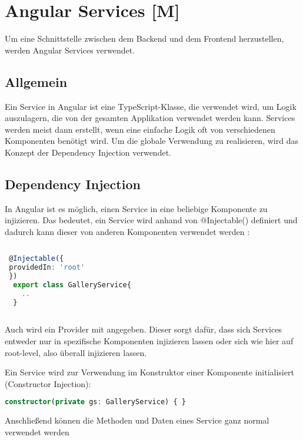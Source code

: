 \section{Angular Services [M]}
Um eine Schnittstelle zwischen dem Backend und dem Frontend herzustellen, werden Angular Services verwendet.

\subsection{Allgemein}
Ein Service in Angular ist eine TypeScript-Klasse, die verwendet wird, um Logik auszulagern, die von der gesamten Applikation verwendet werden kann. Services werden meist dann erstellt, wenn eine einfache Logik oft von verschiedenen Komponenten benötigt wird. Um die globale Verwendung zu realisieren, wird das Konzept der Dependency Injection verwendet. \cite{AngularBuch} \cite{AngularArchitectureService}

\subsection{Dependency Injection}
\label{DPI}
In Angular ist es möglich, einen Service in eine beliebige Komponente zu injizieren. Das bedeutet, ein Service wird anhand von @Injectable() definiert und dadurch kann dieser von anderen Komponenten verwendet werden \cite{AngularBuch}:

\begin{lstlisting}[caption={Eine Klasse Injectable machen},  language=TypeScript,label=lst:impl:injectable]   
    
 @Injectable({
 providedIn: 'root'
 })
  export class GalleryService{
    ..
  }
   
\end{lstlisting}

Auch wird ein Provider mit angegeben. Dieser sorgt dafür, dass sich Services entweder nur in spezifische Komponenten injizieren lassen oder sich wie hier auf root-level, also überall injizieren lassen. \cite{AngularBuch}

Ein Service wird zur Verwendung im Konstruktor einer Komponente initialisiert (Constructor Injection): 

\begin{lstlisting}[caption={Constructor Injection},  language=TypeScript,label=lst:impl:concstructorinjection]   
    constructor(private gs: GalleryService) { }
\end{lstlisting}
Anschließend können die Methoden und Daten eines Service ganz normal verwendet werden

